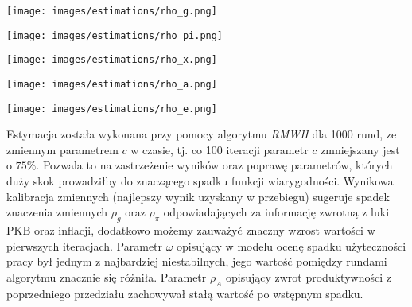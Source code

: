 \begin{center}
    \begin{minipage}{.3\textwidth}
      \centering
      \captionsetup{type=figure}
      \texttt{[image: images/estimations/rho\_g.png]}
      \label{fig:estimation:rho_g}
    \end{minipage}%
    \begin{minipage}{.3\textwidth}
      \centering
      \captionsetup{type=figure}
      \texttt{[image: images/estimations/rho\_pi.png]}
      \label{fig:estimation:rho_pi}
    \end{minipage}
    \begin{minipage}{.3\textwidth}
      \centering
      \captionsetup{type=figure}
      \texttt{[image: images/estimations/rho\_x.png]}
      \label{fig:estimation:rho_x}
    \end{minipage}
\end{center}

\begin{center}
    \begin{minipage}{.4\textwidth}
      \centering
      \captionsetup{type=figure}
      \texttt{[image: images/estimations/rho\_a.png]}
      \label{fig:estimation:rho_A}
    \end{minipage}%
    \begin{minipage}{.4\textwidth}
      \centering
      \captionsetup{type=figure}
      \texttt{[image: images/estimations/rho\_e.png]}
      \label{fig:estimation:rho_E}
    \end{minipage}
\end{center}

Estymacja została wykonana przy pomocy algorytmu \emph{RMWH} dla 1000 rund, ze zmiennym parametrem $c$ w czasie, tj. co 100 iteracji parametr $c$ zmniejszany jest o $75\%$. Pozwala to na zastrzeżenie wyników oraz poprawę parametrów, których duży skok prowadziłby do znaczącego spadku funkcji wiarygodności. Wynikowa kalibracja zmiennych (najlepszy wynik uzyskany w przebiegu) sugeruje spadek znaczenia zmiennych $\rho_g$ oraz $\rho_{\pi}$ odpowiadających za informację zwrotną z luki PKB oraz inflacji, dodatkowo możemy zauważyć znaczny wzrost wartości w pierwszych iteracjach. Parametr $\omega$ opisujący w modelu ocenę spadku użyteczności pracy był jednym z najbardziej niestabilnych, jego wartość pomiędzy rundami algorytmu znacznie się różniła. Parametr $\rho_A$ opisujący zwrot produktywności z poprzedniego przedziału zachowywał stałą wartość po wstępnym spadku.


